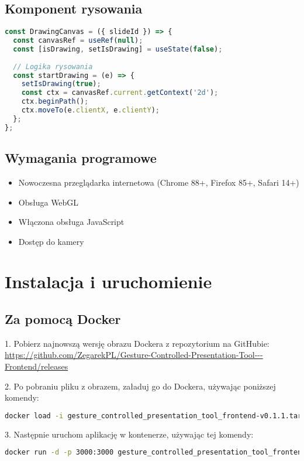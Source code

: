 \documentclass[12pt,a4paper]{article}
\begin{document}
\subsection{Komponent rysowania}
\begin{lstlisting}[language=JavaScript]
const DrawingCanvas = ({ slideId }) => {
  const canvasRef = useRef(null);
  const [isDrawing, setIsDrawing] = useState(false);
  
  // Logika rysowania
  const startDrawing = (e) => {
    setIsDrawing(true);
    const ctx = canvasRef.current.getContext('2d');
    ctx.beginPath();
    ctx.moveTo(e.clientX, e.clientY);
  };
};
\end{lstlisting}

\subsection{Wymagania programowe}
\begin{itemize}
    \item Nowoczesna przeglądarka internetowa (Chrome 88+, Firefox 85+, Safari 14+)
    \item Obsługa WebGL
    \item Włączona obsługa JavaScript
    \item Dostęp do kamery
\end{itemize}

\section{Instalacja i uruchomienie}

\subsection{Za pomocą Docker}

1. Pobierz najnowszą wersję obrazu Dockera z repozytorium na GitHubie:
\url{https://github.com/ZegarekPL/Gesture-Controlled-Presentation-Tool---Frontend/releases}

2. Po pobraniu pliku z obrazem, załaduj go do Dockera, używając poniższej komendy:

\begin{lstlisting}[language=bash]
    docker load -i gesture_controlled_presentation_tool_frontend-v0.1.1.tar
\end{lstlisting}

3. Następnie uruchom aplikację w kontenerze, używając tej komendy:

\begin{lstlisting}[language=bash]
    docker run -d -p 3000:3000 gesture_controlled_presentation_tool_frontend:v0.1.1
\end{lstlisting}
\end{document}
